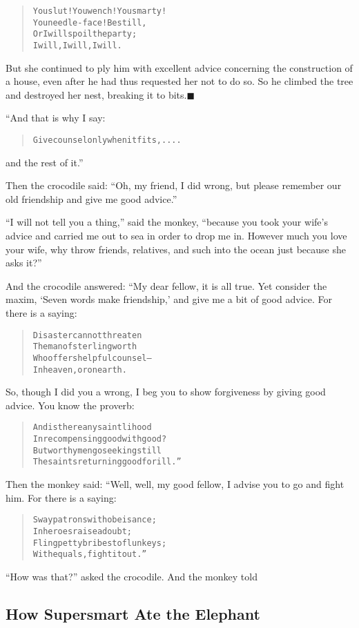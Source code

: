\documentclass[article, twoside, 14pt]{memoir}
\newcommand{\qed}{\hfill \ensuremath{\blacksquare}}
\renewenvironment{verbatim}{%
\begin{quote}%
\vskip -10pt%
\begin{alltt}\normalfont\large}{\end{alltt}%
\end{quote}%
\vskip -10pt
} %
\begin{document}
\begin{verbatim}
You slut! You wench! You smarty!
    You needle-face! Be still,
Or I will spoil the party;
    I will, I will, I will.
\end{verbatim}
But she continued to ply him with excellent advice concerning the
construction of a house, even after he had thus requested her not
to do so. So he climbed the tree and destroyed her nest, breaking
it to bits.\hyperref[s75]{\qed}

“And that is why I say:

\begin{verbatim}
Give counsel only when it fits, ....
\end{verbatim}
and the rest of it.”

Then the crocodile said:
``Oh, my friend, I did wrong, but please remember our old friendship and give me good advice.''

``I will not tell you a thing,'' said the monkey,
``because you took your wife's advice and carried me out to sea in order to drop me in. However much you love your wife, why throw friends, relatives, and such into the ocean just because she asks it?''

And the crocodile answered: “My dear fellow, it is all true. Yet
consider the maxim, `Seven words make friendship,' and give me a
bit of good advice. For there is a saying:

\begin{verbatim}
Disaster cannot threaten
    The man of sterling worth
Who offers helpful counsel--
    In heaven, or on earth.
\end{verbatim}
So, though I did you a wrong, I beg you to show forgiveness by
giving good advice. You know the proverb:

\begin{verbatim}
And is there any saintlihood
In recompensing good with good?
But worthy men go seeking still
The saints returning good for ill.”
\end{verbatim}
Then the monkey said: “Well, well, my good fellow, I advise you to
go and fight him. For there is a saying:

\begin{verbatim}
Sway patrons with obeisance;
    In heroes raise a doubt;
Fling petty bribes to flunkeys;
    With equals, fight it out.”
\end{verbatim}
``How was that?'' asked the crocodile. And the monkey told

\subsection{How Supersmart Ate the Elephant}
\end{document}
